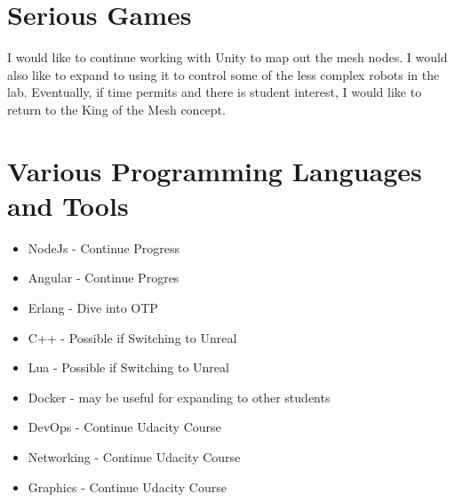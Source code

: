 \documentclass{IEEEtran}
\begin{document}
\section{Serious Games}

I would like to continue working with Unity to map out the mesh nodes. I 
would also like to expand to using it to control some of the less complex
robots in the lab. Eventually, if time permits and there is student interest,
I would like to return to the King of the Mesh concept. 

\section{Various Programming Languages and Tools}

\begin{itemize}
	\item NodeJs - Continue Progress
	\item Angular - Continue Progres
	\item Erlang - Dive into OTP
	\item C++ - Possible if Switching to Unreal
	\item Lua - Possible if Switching to Unreal
	\item Docker - may be useful for expanding to other students
	\item DevOps - Continue Udacity Course
	\item Networking - Continue Udacity Course
	\item Graphics - Continue Udacity Course
\end{itemize}
\end{document}
